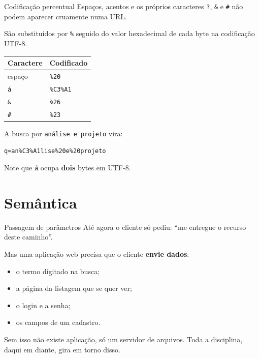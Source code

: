 \documentclass{beamer}
\begin{document}
\begin{frame}{Codificação percentual}
  Espaços, acentos e os próprios caracteres \texttt{?}, \texttt{\&} e
  \texttt{\#} não podem aparecer cruamente numa URL.

  \vspace{0.3cm}
  São substituídos por \texttt{\%} seguido do valor hexadecimal de cada byte na
  codificação UTF-8.

  \begin{center}
    \small
    \begin{tabular}{@{}ll@{}}
      \toprule
      \textbf{Caractere} & \textbf{Codificado} \\
      \midrule
      espaço  & \texttt{\%20} \\
      \texttt{á} & \texttt{\%C3\%A1} \\
      \texttt{\&} & \texttt{\%26} \\
      \texttt{\#} & \texttt{\%23} \\
      \bottomrule
    \end{tabular}
  \end{center}

  \vspace{0.2cm}
  A busca por \texttt{análise e projeto} vira:

  \begin{center}
    \small\texttt{q=an\%C3\%A1lise\%20e\%20projeto}
  \end{center}

  \vspace{0.2cm}
  \footnotesize Note que \texttt{á} ocupa \textbf{dois} bytes em UTF-8.
\end{frame}

\section{Semântica}

\begin{frame}{Passagem de parâmetros}
  Até agora o cliente só pediu: ``me entregue o recurso deste caminho''.

  \vspace{0.4cm}
  Mas uma aplicação web precisa que o cliente \textbf{envie dados}:

  \begin{itemize}
    \item o termo digitado na busca;
    \item a página da listagem que se quer ver;
    \item o login e a senha;
    \item os campos de um cadastro.
  \end{itemize}

  \vspace{0.4cm}
  \begin{block}{}
    Sem isso não existe aplicação, só um servidor de arquivos. Toda a
    disciplina, daqui em diante, gira em torno disso.
  \end{block}
\end{frame}
\end{document}

